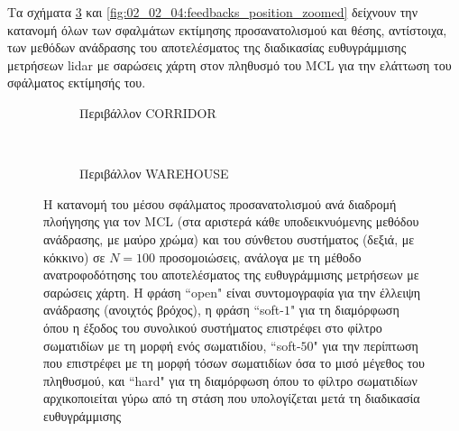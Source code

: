 Τα σχήματα \ref{fig:02_02_04:feedbacks_orientation_zoomed} και
\ref{fig:02_02_04:feedbacks_position_zoomed} δείχνουν την κατανομή όλων των
σφαλμάτων εκτίμησης προσανατολισμού και θέσης, αντίστοιχα, των μεθόδων ανάδρασης
του αποτελέσματος της διαδικασίας ευθυγράμμισης μετρήσεων lidar με σαρώσεις
χάρτη στον πληθυσμό του MCL για την ελάττωση του σφάλματος εκτίμησής του.

\begin{figure}
  \vspace{2cm}
  \begin{subfigure}{\linewidth}
  \hspace{-1.25cm}
    
    \vspace{0.3cm}
    \caption{\small Περιβάλλον CORRIDOR}
    \label{}
  \end{subfigure}\\
  \begin{subfigure}{\linewidth}\vspace{0.5cm}
    \hspace{-1.25cm}
    
    \vspace{0.3cm}
    \caption{\small Περιβάλλον WAREHOUSE}
    \label{}
    \end{subfigure}
\caption{\small Η κατανομή του μέσου σφάλματος προσανατολισμού ανά διαδρομή
         πλοήγησης για τον MCL (στα αριστερά κάθε υποδεικνυόμενης μεθόδου
         ανάδρασης, με μαύρο χρώμα) και του σύνθετου συστήματος (δεξιά, με
         κόκκινο) σε $N=100$ προσομοιώσεις, ανάλογα με τη μέθοδο
         ανατροφοδότησης του αποτελέσματος της ευθυγράμμισης μετρήσεων με
         σαρώσεις χάρτη. Η φράση ``open" είναι συντομογραφία για την έλλειψη
         ανάδρασης (ανοιχτός βρόχος), η φράση ``soft-$1$" για τη διαμόρφωση
         όπου η έξοδος του συνολικού συστήματος επιστρέφει στο φίλτρο
         σωματιδίων με τη μορφή ενός σωματιδίου, ``soft-$50$" για την περίπτωση
         που επιστρέφει με τη μορφή τόσων σωματιδίων όσα το μισό μέγεθος του
         πληθυσμού, και ``hard" για τη διαμόρφωση όπου το φίλτρο σωματιδίων
         αρχικοποιείται γύρω από τη στάση που υπολογίζεται μετά τη διαδικασία
         ευθυγράμμισης}
\label{fig:02_02_04:feedbacks_orientation_zoomed}
\end{figure}

